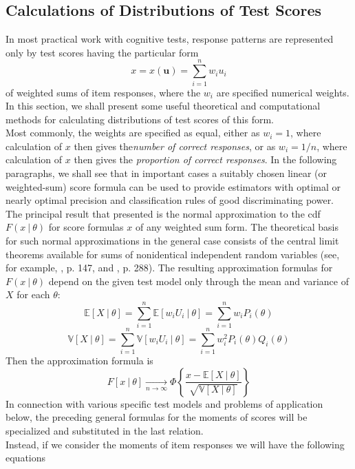 \subsection{Calculations of Distributions of Test Scores}
In most practical work with cognitive tests, response patterns are represented only by test scores having the particular form 
\begin{equation}\label{eq:weisum}
x=x(\boldsymbol{u})=\sum_{i=1}^n w_i u_i
\end{equation}
of weighted sums of item responses, where the $w_i$ are specified numerical weights.
In this section, we shall present some useful theoretical and computational methods for calculating distributions of test scores of this form. \\
Most commonly, the weights are specified as equal, either as $w_i = 1$, where calculation of $x$ then gives the\emph{number of correct responses}, or as $w_i = 1/n$, where calculation of $x$ then gives the \emph{proportion of correct responses}. In the following paragraphs, we shall see that in important cases a suitably chosen linear (or weighted-sum) score formula can be used to provide estimators with optimal or nearly optimal precision and classification rules of good discriminating power.
The principal result that \cite{lord1968} presented is the normal approximation to the cdf $F(x \ | \ \theta )$ for score formulas $x$ of any weighted sum form. The theoretical basis for such normal approximations in the general case consists of the central limit theorems available for sums of nonidentical independent random variables (see, for example, \cite{Lindgren196}, p. 147, and \cite{Loeve1955}, p. 288).
The resulting approximation formulas for $F(x\ | \ \theta)$ depend on the given test model only through the mean and variance of $X$ for each $\theta$:
\begin{equation}\label{eq:expscore}
\mathbb{E}[X \ | \ \theta]=\sum_{i=1}^n{\mathbb{E}[w_i U_i \ | \ \theta]}=\sum_{i=1}^n{w_iP_i(\theta)}
\end{equation}
\begin{equation}\label{eq:varscore}
\mathbb{V}[X \ | \ \theta]=\sum_{i=1}^n{\mathbb{V}[w_i U_i \ | \ \theta]}=\sum_{i=1}^n{w_i^2 P_i(\theta)Q_i(\theta)}
\end{equation}
Then the approximation formula is
\begin{equation}
F[x \ | \ \theta]\xrightarrow[n \to \infty]{}\Phi \left\{ \frac{x-\mathbb{E}[X \ | \ \theta]}{\sqrt{\mathbb{V}[X \ | \ \theta]}}\right\}
\end{equation}
In connection with various specific test models and problems of application
below, the preceding general formulas for the moments of scores will be specialized and substituted in the last relation. \\
Instead, if we consider the moments of item responses we will have the following equations
